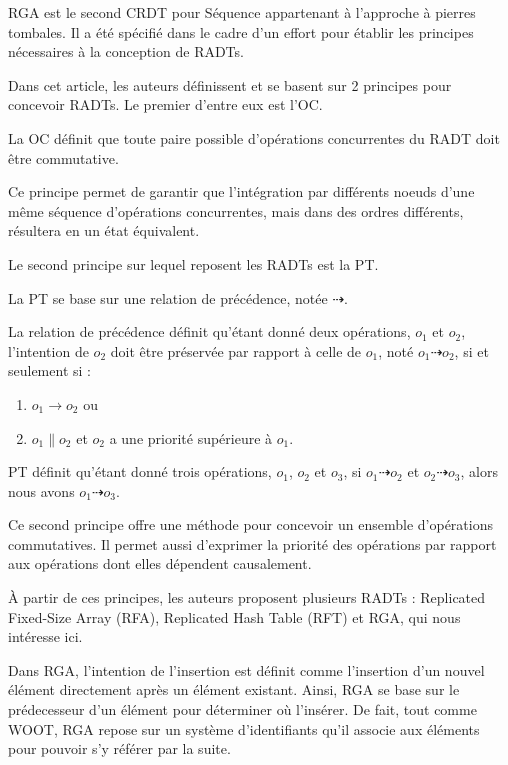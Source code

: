 \acf{RGA} \cite{ROH2011354} est le second \ac{CRDT} pour Séquence appartenant à l'approche à pierres tombales.
Il a été spécifié dans le cadre d'un effort pour établir les principes nécessaires à la conception de \acp{RADT}.

Dans cet article, les auteurs définissent et se basent sur 2 principes pour concevoir RADTs.
Le premier d'entre eux est l'\ac{OC}.
\begin{definition}[\acl{OC}]
  La \acf{OC} définit que toute paire possible d'opérations concurrentes du \ac{RADT} doit être commutative.
\end{definition}
Ce principe permet de garantir que l'intégration par différents noeuds d'une même séquence d'opérations concurrentes, mais dans des ordres différents, résultera en un état équivalent.

Le second principe sur lequel reposent les RADTs est la \ac{PT}.
\begin{definition}[\acl{PT}]
  La \acf{PT} se base sur une relation de précédence, notée $\dashrightarrow$.
  \begin{subdefinition}
    La relation de précédence définit qu'étant donné deux opérations, $o_1$ et $o_2$, l'intention de $o_2$ doit être préservée par rapport à celle de $o_1$, noté $o_1 \dashrightarrow o_2$, si et seulement si :
    \begin{enumerate}
      \item $o_1 \rightarrow o_2$ ou
      \item $o_1 \parallel o_2$ et $o_2$ a une priorité supérieure à $o_1$.
    \end{enumerate}
  \end{subdefinition}
  \ac{PT} définit qu'étant donné trois opérations, $o_1$, $o_2$ et $o_3$, si $o_1 \dashrightarrow o_2$ et $o_2 \dashrightarrow o_3$, alors nous avons $o_1 \dashrightarrow o_3$.
\end{definition}
Ce second principe offre une méthode pour concevoir un ensemble d'opérations commutatives.
Il permet aussi d'exprimer la priorité des opérations par rapport aux opérations dont elles dépendent causalement.

À partir de ces principes, les auteurs proposent plusieurs \acp{RADT} : Replicated Fixed-Size Array (RFA), Replicated Hash Table (RFT) et \acf{RGA}, qui nous intéresse ici.

Dans \ac{RGA}, l'intention de l'insertion est définit comme l'insertion d'un nouvel élément directement après un élément existant.
Ainsi, \ac{RGA} se base sur le prédecesseur d'un élément pour déterminer où l'insérer.
De fait, tout comme WOOT, \ac{RGA} repose sur un système d'identifiants qu'il associe aux éléments pour pouvoir s'y référer par la suite.

